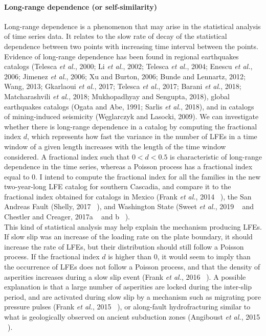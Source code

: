 \documentclass[letterpaper, 12pt]{article}
\begin{document}
\paragraph{Long-range dependence (or self-similarity)} Long-range dependence is a phenomenon that may arise in the statistical analysis of time series data. It relates to the slow rate of decay of the statistical dependence between two points with increasing time interval between the points. Evidence of long-range dependence has been found in regional earthquakes catalogs (Telesca \textit{et al.}, 2000; Li \textit{et al.}, 2002; Telesca \textit{et al.}, 2004; Enescu \textit{et al.}, 2006; Jimenez \textit{et al.}, 2006; Xu and Burton, 2006; Bunde and Lennartz, 2012; Wang, 2013; Gkarlaoui \textit{et al.}, 2017; Telesca \textit{et al.}, 2017; Barani \textit{et al.}, 2018; Matcharashvili \textit{et al.}, 2018; Mukhopadhyay and Sengupta, 2018), global earthquakes catalogs (Ogata and Abe, 1991; Sarlis \textit{et al.}, 2018), and in catalogs of mining-induced seismicity (W\k{e}glarczyk and Lasocki, 2009). We can investigate whether there is long-range dependence in a catalog by computing the fractional index $d$, which represents how fast the variance in the number of LFEs in a time window of a given length increases with the length of the time window considered. A fractional index such that $0 < d < 0.5$ is characteristic of long-range dependence in the time series, whereas a Poisson process has a fractional index equal to 0. I intend to compute the fractional index for all the families in the new two-year-long LFE catalog for southern Cascadia, and compare it to the fractional index obtained for catalogs in Mexico (Frank \textit{et al.}, 2014 ~\cite{FRA_2014}), the San Andreas Fault (Shelly, 2017 ~\cite{SHE_2017}), and Washington State (Sweet \textit{et al.}, 2019 ~\cite{SWE_2019} and Chestler and Creager, 2017a ~\cite{CHE_2017_JGR} and b ~\cite{CHE_2017_G3}). \\

This kind of statistical analysis may help explain the mechanism producing LFEs. If slow slip was an increase of the loading rate on the plate boundary, it should increase the rate of LFEs, but their distribution should still follow a Poisson process. If the fractional index $d$ is higher than 0, it would seem to imply than the occurrence of LFEs does not follow a Poisson process, and that the density of asperities increases during a slow slip event (Frank \textit{et al.}, 2016 ~\cite{FRA_2016_SA}). A possible explanation is that a large number of asperities are locked during the inter-slip period, and are activated during slow slip by a mechanism such as migrating pore pressure pulses (Frank \textit{et al.}, 2015 ~\cite{FRA_2015}), or along-fault hydrofracturing similar to what is geologically observed on ancient subduction zones (Angiboust \textit{et al.}, 2015 ~\cite{ANG_2015}).
\end{document}
